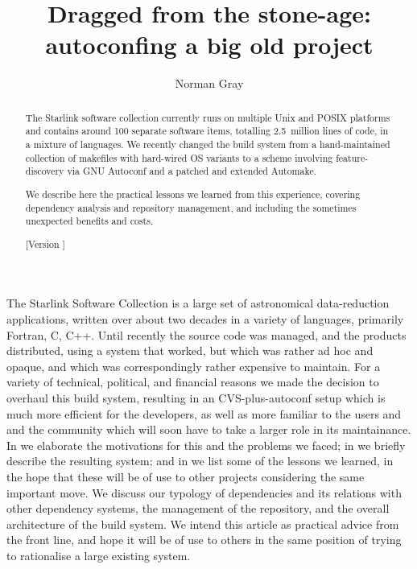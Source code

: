 \documentclass{speauth}
\begin{document}


\title{Dragged from the stone-age: autoconfing a big old project}

\author{Norman Gray\footnotemark}

\noreceived{}
\norevised{}
\noaccepted{}



\begin{abstract}
The Starlink software collection currently runs on multiple
Unix and POSIX platforms and contains around 100 separate software items,
totalling 2.5~million lines of code, in a mixture of languages.  We
recently changed the build system from a hand-maintained collection of
makefiles with hard-wired OS variants to a scheme involving
feature-discovery via GNU Autoconf and a patched and extended Automake.

We describe here the practical lessons we learned from this
experience, covering dependency analysis and repository management,
and including the sometimes unexpected benefits and costs.

[Version \RCSRevision]
\end{abstract}



The Starlink Software Collection \cite{draper05} is a large set of
astronomical data-reduction applications, written over about two
decades in a variety of languages, primarily Fortran, C, C++.  Until
recently the source code was managed, and the
products distributed, using a system that worked, but which was
rather ad hoc and opaque, and which was correspondingly rather
expensive to maintain.  For a variety of technical, political, and financial
reasons we made the decision to overhaul this build system, resulting
in an CVS-plus-autoconf setup which is much more efficient for the
developers, as well as more familiar to the users and and the
community which will soon have to take a larger role in its maintainance.
In  we elaborate the 
motivations for this and the problems we faced; in
 we briefly describe the resulting system; and
in  we list some of the lessons we learned, in
the hope that these will be of use to other projects considering the
same important move.  We discuss our typology of dependencies and its
relations with other dependency systems, the management of the
repository, and the overall architecture of the build system.
We intend this article as practical advice from the front line, and
hope it will be of use to others in the same position of trying to
rationalise a large existing system.
\end{document}
